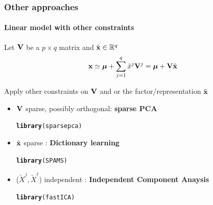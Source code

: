 \documentclass{beamer}\usepackage[]{graphicx}\usepackage[]{color}
\makeatletter
\newcommand{\hlstd}[1]{\textcolor[rgb]{0.345,0.345,0.345}{#1}}%
\newcommand{\hlkwd}[1]{\textcolor[rgb]{0.737,0.353,0.396}{\textbf{#1}}}%
\newenvironment{kframe}{%
 \def\at@end@of@kframe{}%
 \ifinner\ifhmode%
  \def\at@end@of@kframe{\end{minipage}}%
  \begin{minipage}{\columnwidth}%
 \fi\fi%
 \def\FrameCommand##1{\hskip\@totalleftmargin \hskip-\fboxsep
 \colorbox{shadecolor}{##1}\hskip-\fboxsep
     \hskip-\linewidth \hskip-\@totalleftmargin \hskip\columnwidth}%
 \MakeFramed {\advance\hsize-\width
   \@totalleftmargin\z@ \linewidth\hsize
   \@setminipage}}%
 {\par\unskip\endMakeFramed%
 \at@end@of@kframe}
\newenvironment{knitrout}{}{} %
\makeatother
\begin{document}
\begin{frame}
  \frametitle{Other approaches}
  \framesubtitle{Linear model with other constraints}
    
    Let $\mathbf{V}$ be a $p\times q$ matrix and $\tilde {\mathbf{x}} \in \mathbb{R}^q$
    \begin{equation*}
      \mathbf{x} \simeq  \boldsymbol{\mu} + \sum_{j=1}^q \tilde x^j \mathbf{V}^j = \boldsymbol{\mu} + \mathbf{V} \tilde{\mathbf{x}}
    \end{equation*}
  
    Apply other constraints on $\mathbf{V}$ and or the factor/representation $\tilde{\mathbf{x}}$
    \begin{itemize}
      \item $\mathbf{V}$ sparse, possibly orthogonal: \alert{\bf sparse PCA}\\
\begin{knitrout}\scriptsize
{}\color{fgcolor}\begin{kframe}
\begin{alltt}
\hlkwd{library}\hlstd{(sparsepca)}
\end{alltt}
\end{kframe}
\end{knitrout}
      \item $\tilde {\mathbf{x}}$ sparse : \alert{\bf Dictionary learning}
\begin{knitrout}\scriptsize
{}\color{fgcolor}\begin{kframe}
\begin{alltt}
\hlkwd{library}\hlstd{(SPAMS)}
\end{alltt}
\end{kframe}
\end{knitrout}
      \item ($\tilde X^j, \tilde X^\ell$) independent : \alert{\bf Independent Component Anaysis}
\begin{knitrout}\scriptsize
{}\color{fgcolor}\begin{kframe}
\begin{alltt}
\hlkwd{library}\hlstd{(fastICA)}
\end{alltt}
\end{kframe}
\end{knitrout}
    \end{itemize}

\end{frame}
 
\end{document}

